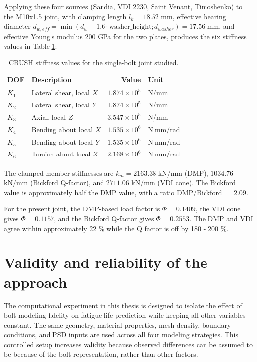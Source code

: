 \documentclass[a4paper,twoside]{bth}
\begin{document}
Applying these four sources (Sandia, VDI 2230, Saint Venant, Timoshenko) to the M10x1.5 joint, with clamping length $l_k = 18.52$ mm, effective bearing diameter $d_{w, eff} = \min(d_w + 1.6\cdot \text{washer\_height}; d_{washer}) = 17.56$ mm, and effective Young's modulus 200 GPa for the two plates, produces the six stiffness values in Table \ref{tab:CBUSHstiffness}:

\begin{table}[H]
    \centering
    \caption{CBUSH stiffness values for the single-bolt joint studied.}
    \label{tab:CBUSHstiffness}
    \begin{tabular}{llrl}
        \toprule
        \textbf{\ac{DOF}} & \textbf{Description}       & \textbf{Value}        & \textbf{Unit} \\
        \midrule
        $K_1$        & Lateral shear, local $X$   & $1.874 \times 10^{5}$ & N/mm \\
        $K_2$        & Lateral shear, local $Y$   & $1.874 \times 10^{5}$ & N/mm \\
        $K_3$        & Axial,        local $Z$    & $3.547 \times 10^{5}$ & N/mm \\
        $K_4$        & Bending about local $X$    & $1.535 \times 10^{6}$ & N$\cdot$mm/rad \\
        $K_5$        & Bending about local $Y$    & $1.535 \times 10^{6}$ & N$\cdot$mm/rad \\
        $K_6$        & Torsion about local $Z$    & $2.168 \times 10^{6}$ & N$\cdot$mm/rad \\
        \bottomrule
    \end{tabular}
\end{table}
\newpage
The clamped member stiffnesses are $k_m = 2163.38$ kN/mm (DMP), $1034.76$ kN/mm (Bickford Q-factor), and $2711.06$ kN/mm (VDI cone). The Bickford value is approximately half the DMP value, with a ratio DMP/Bickford $= 2.09$.

For the present joint, the DMP-based load factor is $\Phi = 0.1409$, the VDI cone gives $\Phi = 0.1157$, and the Bickford Q-factor gives $\Phi = 0.2553$. The DMP and VDI agree within approximately 22 \% while the Q factor is off by 180 - 200 \%.

\section{Validity and reliability of the approach} \label{sec:validity}

The computational experiment in this thesis is designed to isolate the effect of bolt modeling fidelity on fatigue life prediction while keeping all other variables constant. The same geometry, material properties, mesh density, boundary conditions, and \ac{PSD} inputs are used across all four modeling strategies. This controlled setup increases validity because observed differences can be assumed to be because of the bolt representation, rather than other factors.
\end{document}
